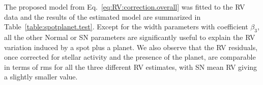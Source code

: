 \documentclass{aa}
\begin{document}
The proposed model from Eq.~\eqref{eq:RV:correction.overall} was fitted to the RV data and the results of the estimated model are summarized in Table~\ref{table:spotplanet.test}.   Except for the width parameters with coefficient $\beta_3$, all the other Normal or SN parameters are significantly useful to explain the RV variation induced by a spot plus a planet. We also observe that the RV residuals, once corrected for stellar activity and the presence of the planet, are comparable in terms of rms for all the three different RV estimates, with SN mean RV giving a slightly smaller value.
\end{document}
